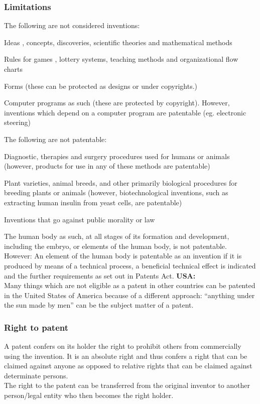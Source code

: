 \subsubsection{Limitations}
The following are not considered inventions:
\begin{compactitem}
	\item Ideas , concepts, discoveries, scientific theories and mathematical methods
	\item Rules for games , lottery systems, teaching methods and organizational flow charts
	\item Forms (these can be protected as designs or under copyrights.)
	\item Computer programs as such (these are protected by copyright). However, inventions which depend on a computer program are patentable (eg. electronic steering)
\end{compactitem}
The following are not patentable:
\begin{compactitem}
	\item Diagnostic, therapies and surgery procedures used for humans or animals (however, products for use in any of these methods are patentable)
	\item Plant varieties, animal breeds, and other primarily biological procedures for breeding plants or animals (however, biotechnological inventions, such as extracting human insulin from yeast cells, are patentable)
	\item Inventions that go against public morality or law
\end{compactitem}
The human body as such, at all stages of its formation and development, including the embryo, or elements of the human body, is not patentable. However: An element of the human body is patentable as an invention if it is produced by means of a technical process, a beneficial technical effect is indicated and the further requirements as set out in Patents Act.
\textbf{USA:}\\
Many things which are not eligible as a patent in other countries can be patented in the United States of America because of a different approach: “anything under the sun made by men” can be the subject matter of a patent.

\subsubsection{Right to patent}
A patent confers on its holder the right to prohibit others from commercially using the invention. It is an absolute right and thus confers a right that can be claimed against anyone as opposed to relative rights that can be claimed against determinate persons. \\
The right to the patent can be transferred from the original inventor to another person/legal entity who then becomes the right holder.

